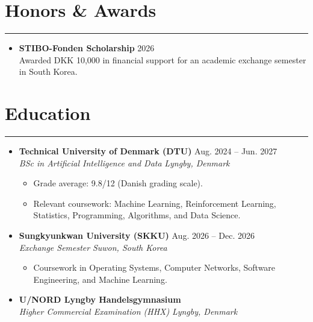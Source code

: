 \documentclass[letterpaper,10pt]{article}
\begin{document}
\section*{Honors \& Awards}
\hrule
\vspace{5pt}

\begin{itemize}
    \item[]
    \textbf{STIBO-Fonden Scholarship}
    \hfill 2026\\
    Awarded DKK 10,000 in financial support
    for an academic exchange semester
    in South Korea.
\end{itemize}

\section*{Education}
\hrule
\vspace{5pt}

\begin{itemize}

    \item[]
    \textbf{Technical University of Denmark
    (DTU)}
    \hfill Aug. 2024 -- Jun. 2027\\
    \textit{BSc in Artificial Intelligence
    and Data}
    \hfill \textit{Lyngby, Denmark}

    \begin{itemize}
        \item Grade average: 9.8/12
        (Danish grading scale).
        \item Relevant coursework:
        Machine Learning, Reinforcement Learning,
        Statistics, Programming, Algorithms,
        and Data Science.
    \end{itemize}

    \vspace{5pt}

    \item[]
    \textbf{Sungkyunkwan University (SKKU)}
    \hfill Aug. 2026 -- Dec. 2026\\
    \textit{Exchange Semester}
    \hfill \textit{Suwon, South Korea}

    \begin{itemize}
        \item Coursework in Operating Systems,
        Computer Networks, Software Engineering,
        and Machine Learning.
    \end{itemize}

    \vspace{5pt}

    \item[]
    \textbf{U/NORD Lyngby Handelsgymnasium}\\
    \textit{Higher Commercial Examination (HHX)}
    \hfill \textit{Lyngby, Denmark}

\end{itemize}
\end{document}
